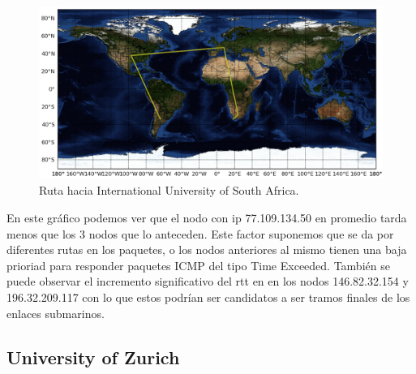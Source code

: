\documentclass[10pt, a4paper]{article}
\begin{document}
\begin{figure}[H] %
\begin{center}
\includegraphics[width=400pt]{../imgs/map-unisa.png}
\caption{Ruta hacia International University of South Africa.}
\end{center}
\end{figure}



En este gráfico podemos ver que el nodo con ip 77.109.134.50 en promedio tarda menos que los 3 nodos que lo anteceden. Este factor suponemos que se da por diferentes rutas en los paquetes, o los nodos anteriores al mismo tienen una baja prioriad para responder paquetes ICMP del tipo Time Exceeded.
También se puede observar el incremento significativo del rtt en en los nodos 146.82.32.154 y 196.32.209.117 con lo que estos podrían ser candidatos a ser tramos finales de los enlaces submarinos. 


\subsection{University of Zurich}
\end{document}

